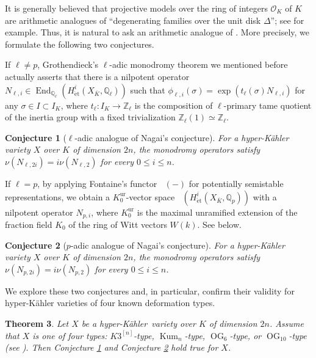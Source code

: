 \documentclass[12pt,reqno]{amsart}
\newtheorem{thm}{Theorem}[section]
\newtheorem{conj}[thm]{Conjecture}
\theoremstyle{definition}
\newcommand{\Q}{{\mathds Q}}
\newcommand{\Z}{{\mathds Z}}
\DeclareMathOperator{\Dpst}{\mathit{D}_{\mathrm{pst}}}
\newcommand\End{\mathop{\mathrm{End}}\nolimits}
\newcommand{\et}{\mathrm{\acute{e}t}}
\newcommand{\hk}{hyper-Kähler~}
\newcommand\Kum{\mathop{\mathrm{Kum}}\nolimits}
\newcommand\OG{\mathop{\mathrm{OG}}\nolimits}
\newcommand{\cO}{\mathcal{O}}
\DeclareMathOperator{\ur}{ur}
\numberwithin{equation}{section}
\begin{document}
It is generally believed that projective models over the ring of integers $\cO_K$ of $K$ are arithmetic analogues of ``degenerating families over the unit disk $\Delta$''; see \cite[Table 9.1]{DeligneHodgeI} for example. Thus, it is natural to ask an arithmetic analogue of . More precisely, we formulate the following two conjectures.

If $\ell \neq p$, Grothendieck's $\ell$-adic monodromy theorem we mentioned before actually asserts that there is a nilpotent operator $N_{\ell,i} \in \End_{\Q_{\ell}}(H^i_{\et}(X_{\overline{K}},\Q_{\ell}))$ such that
$\phi_{\ell,i}(\sigma) = \exp(t_{\ell}(\sigma)N_{\ell,i})$
for any $\sigma \in I \subset I_K$,
where $t_{\ell} \colon I_K \to \Z_{\ell}$ is the composition of $\ell$-primary tame quotient of the inertia group with a fixed trivialization $\Z_{\ell}(1) \simeq \Z_{\ell}$.
\begin{conj}[$\ell$-adic analogue of Nagai's conjecture]
\label{ell adic Nagai Conjecture}For a hyper-Kähler variety $X$ over $K$ of dimension $2n$, the monodromy operators satisfy
$
\nu(N_{\ell,2i}) =  i\nu(N_{\ell,2})
$
for every $0 \leq i \leq n$.
\end{conj}

If $\ell =p$, by applying Fontaine's functor $\Dpst(-)$ 
for potentially semistable representations,
we obtain a $K_0^{\ur}$-vector space 
$
\Dpst(H^i_{\et}(X_{\overline{K}},\Q_p))
$
with a nilpotent operator
$N_{p,i}$, where $K_0^{\ur}$ is the maximal unramified extension of the fraction field $K_0$ of the ring of Witt vectors $W(k)$.
See  below.

\begin{conj}[$p$-adic analogue of Nagai's conjecture]
\label{p adic Nagai Conjecture}
For a hyper-Kähler variety $X$ over $K$ of dimension $2n$, the monodromy operators satisfy 
$
\nu(N_{p, 2i}) =  i\nu(N_{p,2})
$
for every $0 \leq i \leq n$.
\end{conj}

We explore these two conjectures and, in particular, confirm their validity for hyper-Kähler varieties of four known deformation types.

\begin{thm}
\label{Main Theorem for known hk}
Let $X$ be a \hk variety over $K$ of dimension $2n$.
Assume that $X$ is one of four types: $K3^{[n]}$-type, $\Kum_n$-type, $\OG_6$-type, or $\OG_{10}$-type (see ).
Then Conjecture \ref{ell adic Nagai Conjecture}
and 
Conjecture \ref{p adic Nagai Conjecture}
hold true for $X$.
\end{thm}
\end{document}
